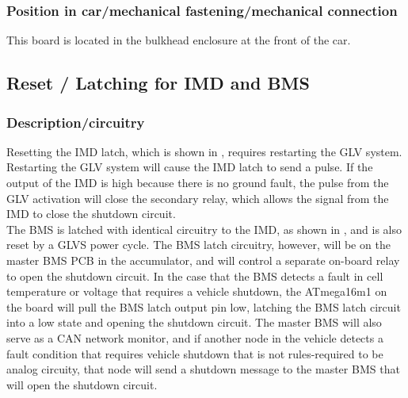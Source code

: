 \documentclass{article}
\begin{document}
\subsubsection{Position in car/mechanical fastening/mechanical connection}

This board is located in the bulkhead enclosure at the front of the car.

\subsection{Reset / Latching for IMD and BMS}\label{reset_latching_for_imd_and_bms}
\subsubsection{Description/circuitry}

Resetting the IMD latch, which is shown in  , requires restarting the GLV system. Restarting the GLV system will cause the IMD latch to send a pulse. If the output of the IMD is high because there is no ground fault, the pulse from the GLV activation will close the secondary relay, which allows the signal from the IMD to close the shutdown circuit.\\

The BMS is latched with identical circuitry to the IMD, as shown in , and is also reset by a GLVS power cycle. The BMS latch circuitry, however, will be on the master BMS PCB in the accumulator, and will control a separate on-board relay to open the shutdown circuit. In the case that the BMS detects a fault in cell temperature or voltage that requires a vehicle shutdown, the ATmega16m1 on the board will pull the BMS latch output pin low, latching the BMS latch circuit into a low state and opening the shutdown circuit. The master BMS will also serve as a CAN network monitor, and if another node in the vehicle detects a fault condition that requires vehicle shutdown that is not rules-required to be analog circuity, that node will send a shutdown message to the master BMS that will open the shutdown circuit. 
\end{document}
